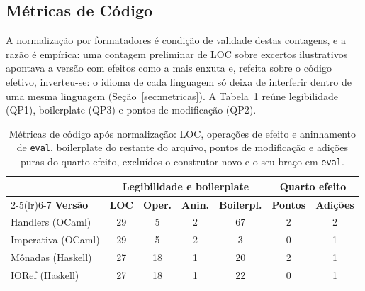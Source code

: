 \documentclass[12pt]{article}
\newcommand{\AdicoesHandlers}{2}
\newcommand{\AdicoesImperativa}{1}
\newcommand{\AdicoesIoref}{1}
\newcommand{\AdicoesMonadas}{1}
\newcommand{\AninHandlers}{2}
\newcommand{\AninImperativa}{2}
\newcommand{\AninIoref}{1}
\newcommand{\AninMonadas}{1}
\newcommand{\BoilerHandlers}{67}
\newcommand{\BoilerImperativa}{3}
\newcommand{\BoilerIoref}{22}
\newcommand{\BoilerMonadas}{20}
\newcommand{\LocEvalHandlers}{29}
\newcommand{\LocEvalImperativa}{29}
\newcommand{\LocEvalIoref}{27}
\newcommand{\LocEvalMonadas}{27}
\newcommand{\OperHandlers}{5}
\newcommand{\OperImperativa}{5}
\newcommand{\OperIoref}{18}
\newcommand{\OperMonadas}{18}
\newcommand{\PontosHandlers}{2}
\newcommand{\PontosImperativa}{0}
\newcommand{\PontosIoref}{0}
\newcommand{\PontosMonadas}{2}
\begin{document}
\subsection{Métricas de Código}\label{sec:metricas-codigo}

A normalização por formatadores é condição de validade destas contagens, e a
razão é empírica: uma contagem preliminar de LOC sobre excertos ilustrativos
apontava a versão com efeitos como a mais enxuta e, refeita sobre o código
efetivo, inverteu-se: o idioma de cada linguagem só deixa de interferir dentro
de uma mesma linguagem (Seção~\ref{sec:metricas}). A Tabela~\ref{tab:metricas}
reúne legibilidade (QP1), boilerplate (QP3) e pontos de modificação (QP2).

\begin{table}[ht]
  \centering
  \caption{Métricas de código após normalização: LOC, operações de efeito e
           aninhamento de \texttt{eval}, boilerplate do restante do
           arquivo, pontos de modificação e adições puras do quarto efeito,
           excluídos o construtor novo e o seu braço em \texttt{eval}.}
  \label{tab:metricas}
  \footnotesize\setlength{\tabcolsep}{4pt}\renewcommand{\arraystretch}{1.1}
  \begin{tabular}{@{}lcccccc@{}}
    \toprule
    & \multicolumn{4}{c}{\textbf{Legibilidade e boilerplate}}
      & \multicolumn{2}{c}{\textbf{Quarto efeito}} \\
    \cmidrule(lr){2-5}\cmidrule(lr){6-7}
    \textbf{Versão} & \textbf{LOC} & \textbf{Oper.} & \textbf{Anin.}
      & \textbf{Boilerpl.} & \textbf{Pontos} & \textbf{Adições} \\
    \midrule
    Handlers (OCaml)            & \LocEvalHandlers & \OperHandlers & \AninHandlers & \BoilerHandlers & \PontosHandlers & \AdicoesHandlers \\
    Imperativa (OCaml)          & \LocEvalImperativa & \OperImperativa & \AninImperativa & \BoilerImperativa & \PontosImperativa & \AdicoesImperativa \\
    Mônadas (Haskell)           & \LocEvalMonadas & \OperMonadas & \AninMonadas & \BoilerMonadas & \PontosMonadas & \AdicoesMonadas \\
    IORef (Haskell)             & \LocEvalIoref & \OperIoref & \AninIoref & \BoilerIoref & \PontosIoref & \AdicoesIoref \\
    \bottomrule
  \end{tabular}
\end{table}
\end{document}
